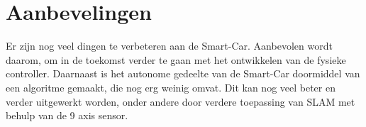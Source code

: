 \section{Aanbevelingen}
Er zijn nog veel dingen te verbeteren aan de \gls{Smart-Car}. 
Aanbevolen wordt daarom, om in de toekomst verder te gaan met het ontwikkelen van de fysieke controller. Daarnaast is het autonome gedeelte van de \gls{Smart-Car} doormiddel van een algoritme gemaakt, die nog erg weinig omvat. Dit kan nog veel beter en verder uitgewerkt worden, onder andere door verdere toepassing van \gls{SLAM} met behulp van de 9 axis sensor. 